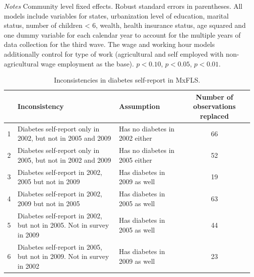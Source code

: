\documentclass[12pt,english]{article}
\providecommand{\tabularnewline}{\\}
\begin{document}
\begin{table}[p]
\begin{center}
\begin{adjustbox}{max width=\linewidth}
\begin{threeparttable}
{\begin{tabular}{l*{6}{S
								S}}
						\bottomrule
					\end{tabular}
					\begin{tablenotes}
						\item \footnotesize \textit{Notes} Community level fixed effects. Robust standard errors in parentheses. All models include variables for  states, urbanization level of education, marital status, number of children < 6, wealth, health insurance status, age squared and one dummy variable for each calendar year to account for the multiple years of data collection for the third wave. The wage and working hour models additionally control for type of work (agricultural and self employed with non-agricultural wage employment as the base). \sym{*} \(p<0.10\), \sym{**} \(p<0.05\), \sym{***} \(p<0.01\).
					\end{tablenotes}
				}
			\end{threeparttable}
		\end{adjustbox}
	\end{center}
\end{table}

\clearpage

\begin{table}[p]
	\caption{\label{tab:Inconsistencies}Inconsistencies in diabetes self-report in MxFLS.}
	\begin{center}
		\begin{adjustbox}{max width=\linewidth} 
			\begin{tabular}{lllc}
				\hline 
				&Inconsistency  & Assumption  & Number of observations replaced\tabularnewline
				\hline 
				1 &Diabetes self-report only in 2002, but not in 2005 and 2009  & Has no diabetes in 2002 either  & 66\tabularnewline
				2 &Diabetes self-report only in 2005, but not in 2002 and 2009  & Has no diabetes in 2005 either  & 52\tabularnewline
				3 &Diabetes self-report in 2002, 2005 but not in 2009  & Has diabetes in 2009 as well  & 19\tabularnewline
				4 &Diabetes self-report in 2002, 2009 but not in 2005  & Has diabetes in 2005 as well  & 63\tabularnewline
				5 &Diabetes self-report in 2002, but not in 2005. Not in survey in 2009  & Has diabetes in 2005 as well  & 44\tabularnewline
				6 &Diabetes self-report in 2005, but not in 2009. Not in survey in 2002  & Has diabetes in 2009 as well  & 23\tabularnewline
			\end{tabular}
		\end{adjustbox}
	\end{center}
\end{table}
\end{document}
